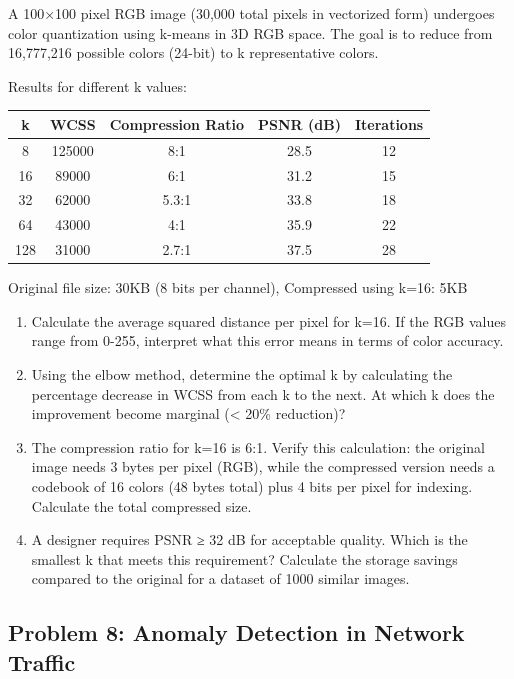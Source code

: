 \documentclass[12pt]{article}
\begin{document}
A 100×100 pixel RGB image (30,000 total pixels in vectorized form) undergoes color quantization using k-means in 3D RGB space. The goal is to reduce from 16,777,216 possible colors (24-bit) to k representative colors.

Results for different k values:
\begin{center}
\begin{tabular}{ccccc}
\toprule
k & WCSS & Compression Ratio & PSNR (dB) & Iterations \\
\midrule
8 & 125000 & 8:1 & 28.5 & 12 \\
16 & 89000 & 6:1 & 31.2 & 15 \\
32 & 62000 & 5.3:1 & 33.8 & 18 \\
64 & 43000 & 4:1 & 35.9 & 22 \\
128 & 31000 & 2.7:1 & 37.5 & 28 \\
\bottomrule
\end{tabular}
\end{center}

Original file size: 30KB (8 bits per channel), Compressed using k=16: 5KB

\begin{enumerate}[label=(\alph*)]
\item Calculate the average squared distance per pixel for k=16. If the RGB values range from 0-255, interpret what this error means in terms of color accuracy.

\item Using the elbow method, determine the optimal k by calculating the percentage decrease in WCSS from each k to the next. At which k does the improvement become marginal (< 20\% reduction)?

\item The compression ratio for k=16 is 6:1. Verify this calculation: the original image needs 3 bytes per pixel (RGB), while the compressed version needs a codebook of 16 colors (48 bytes total) plus 4 bits per pixel for indexing. Calculate the total compressed size.

\item A designer requires PSNR ≥ 32 dB for acceptable quality. Which is the smallest k that meets this requirement? Calculate the storage savings compared to the original for a dataset of 1000 similar images.
\end{enumerate}

\subsection*{Problem 8: Anomaly Detection in Network Traffic}
\end{document}

